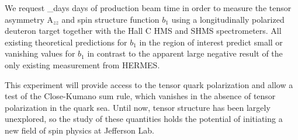 
We request \production_days days of production beam time in order to  measure
the tensor asymmetry A$_{zz}$ and spin structure function $b_1$ using a 
longitudinally polarized deuteron 
target together with the Hall C HMS and SHMS spectrometers.
All existing theoretical predictions for $b_1$ in the region of interest predict small or vanishing
values for $b_1$  
in contrast to the apparent large negative result of the only existing measurement from HERMES. 

This experiment will provide access to the tensor quark polarization and allow a test of the
Close-Kumano sum rule, which vanishes in the absence of tensor polarization in the quark
sea.
Until now, tensor structure has been largely unexplored, so the study
of these quantities holds the potential of initiating a new field of spin physics at
Jefferson Lab.


